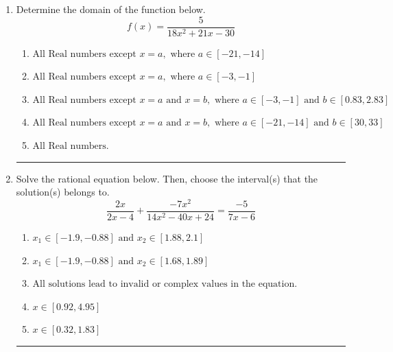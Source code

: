 \documentclass[14pt]{extbook}
\newcommand{\litem}[1]{\item#1\hspace*{-1cm}\rule{\textwidth}{0.4pt}}
\begin{document}
\begin{enumerate}
\litem{
Determine the domain of the function below.\[ f(x) = \frac{5}{18x^{2} +21 x -30} \]\begin{enumerate}[label=\Alph*.]
\item \( \text{All Real numbers except } x = a, \text{ where } a \in [-21, -14] \)
\item \( \text{All Real numbers except } x = a, \text{ where } a \in [-3, -1] \)
\item \( \text{All Real numbers except } x = a \text{ and } x = b, \text{ where } a \in [-3, -1] \text{ and } b \in [0.83, 2.83] \)
\item \( \text{All Real numbers except } x = a \text{ and } x = b, \text{ where } a \in [-21, -14] \text{ and } b \in [30, 33] \)
\item \( \text{All Real numbers.} \)

\end{enumerate} }
\litem{
Solve the rational equation below. Then, choose the interval(s) that the solution(s) belongs to.\[ \frac{2x}{2x -4} + \frac{-7x^{2}}{14x^{2} -40 x + 24} = \frac{-5}{7x -6} \]\begin{enumerate}[label=\Alph*.]
\item \( x_1 \in [-1.9, -0.88] \text{ and } x_2 \in [1.88,2.1] \)
\item \( x_1 \in [-1.9, -0.88] \text{ and } x_2 \in [1.68,1.89] \)
\item \( \text{All solutions lead to invalid or complex values in the equation.} \)
\item \( x \in [0.92,4.95] \)
\item \( x \in [0.32,1.83] \)


\end{enumerate}}
\end{enumerate}
\end{document}
